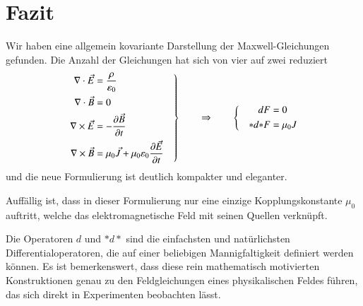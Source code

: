 \section{Fazit}
Wir haben eine allgemein kovariante Darstellung der Maxwell-Gleichungen gefunden. Die Anzahl der Gleichungen hat sich von vier auf zwei reduziert
\[
\left.
\begin{aligned}
	\nabla \cdot \vec{E} &= \frac{\rho}{\varepsilon_0} \\
	\nabla \cdot \vec{B} &= 0 \\
	\nabla \times \vec{E} &= - \frac{\d \vec{B}}{\d t} \\
	\nabla \times \vec{B} &= \mu_0 \vec{J} + \mu_0 \varepsilon_0 \frac{\d \vec{E}}{\d t}
\end{aligned}
\quad
\right\}
\qquad\Rightarrow\qquad
\left\{
\quad
\begin{aligned}
	dF &= 0 \\
	{\ast}d{\ast}F &= \mu_0 J 
\end{aligned}
\right.
\]
und die neue Formulierung ist deutlich kompakter und eleganter.

Auffällig ist, dass in dieser Formulierung nur eine einzige Kopplungskonstante $\mu_0$ auftritt, welche das elektromagnetische Feld mit seinen Quellen verknüpft.  

Die Operatoren $d$ und $\ast d \ast$ sind die einfachsten und natürlichsten Differentialoperatoren, die auf einer beliebigen Mannigfaltigkeit definiert werden können. Es ist bemerkenswert, dass diese rein mathematisch motivierten Konstruktionen genau zu den Feldgleichungen eines physikalischen Feldes führen, das sich direkt in Experimenten beobachten lässt.


